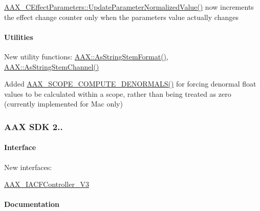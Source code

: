 \begin{DoxyItemize}
\item \hyperlink{a00018_a56a9f41a975b48f583655db7b43aae5a}{A\+A\+X\+\_\+\+C\+Effect\+Parameters\+::\+Update\+Parameter\+Normalized\+Value()} now increments the effect change counter only when the parameter\textquotesingle{}s value actually changes 
\end{DoxyItemize}\hypertarget{a00375_aax_sdk_2p2p2_Utilities}{}\paragraph{Utilities}\label{a00375_aax_sdk_2p2p2_Utilities}

\begin{DoxyItemize}
\item New utility functions\+: {\ttfamily \hyperlink{a00288_a34d219233eb5c9836b837fa2a67150d1}{A\+A\+X\+::\+As\+String\+Stem\+Format()}}, {\ttfamily \hyperlink{a00288_adfab6bf193c09266ecec2069b8da0c5c}{A\+A\+X\+::\+As\+String\+Stem\+Channel()}}  
\item Added \hyperlink{a00201_ad45309abfd0e2faa7a28c9ed753f7806}{A\+A\+X\+\_\+\+S\+C\+O\+P\+E\+\_\+\+C\+O\+M\+P\+U\+T\+E\+\_\+\+D\+E\+N\+O\+R\+M\+A\+L\+S()} for forcing denormal float values to be calculated within a scope, rather than being treated as zero (currently implemented for Mac only) 
\end{DoxyItemize}\hypertarget{a00375_aax_sdk_2p2p1}{}\subsubsection{A\+A\+X S\+D\+K 2..}\label{a00375_aax_sdk_2p2p1}
\hypertarget{a00375_aax_sdk_2p2p1_Interface}{}\paragraph{Interface}\label{a00375_aax_sdk_2p2p1_Interface}

\begin{DoxyItemize}
\item New interfaces\+: 
\begin{DoxyItemize}
\item \hyperlink{a00055}{A\+A\+X\+\_\+\+I\+A\+C\+F\+Controller\+\_\+\+V3} 
\end{DoxyItemize}
\end{DoxyItemize}\hypertarget{a00375_aax_sdk_2p2p1_Documentation}{}\paragraph{Documentation}\label{a00375_aax_sdk_2p2p1_Documentation}

